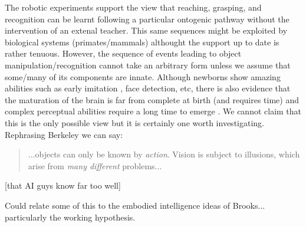 The robotic experiments support the view that reaching, grasping, and recognition
can be learnt following a particular ontogenic pathway without the
intervention of an extenal teacher.
This same sequences might be exploited by biological systems (primates/mammals)
althought the support up to date is rather tenuous. However, the 
sequence of events leading to object manipulation/recognition cannot take
an arbitrary form unless we assume that some/many of its components are innate.
Although newborns show amazing abilities \cite{spelke-2000} such as early imitation 
\cite{meltzoff-moore-1977}, face detection, etc, there is also evidence 
that the maturation of the brain is far from complete at birth (and requires time) and
complex perceptual abilities require a long time to emerge \cite{kovacs00human}.
We cannot claim that this is the only possible view but it is certainly one worth
investigating. Rephrasing Berkeley we can say:
\begin{quote}
...objects can only be known by
\emph{action}. Vision is subject to illusions, 
which arise from \emph{many different} problems...
\end{quote}
[that AI guys know far too well]





Could relate some of this to the embodied intelligence ideas
of Brooks... particularly the working hypothesis.

